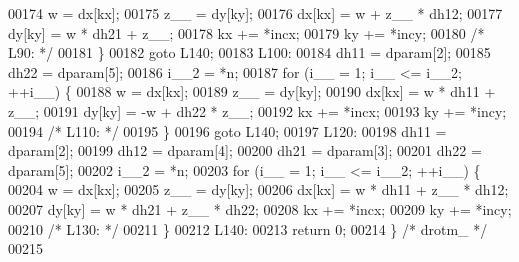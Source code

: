 \begin{DoxyCode}
00174     w = dx[kx];
00175     z\_\_ = dy[ky];
00176     dx[kx] = w + z\_\_ * dh12;
00177     dy[ky] = w * dh21 + z\_\_;
00178     kx += *incx;
00179     ky += *incy;
00180 \textcolor{comment}{/* L90: */}
00181     \}
00182     \textcolor{keywordflow}{goto} L140;
00183 L100:
00184     dh11 = dparam[2];
00185     dh22 = dparam[5];
00186     i\_\_2 = *n;
00187     \textcolor{keywordflow}{for} (i\_\_ = 1; i\_\_ <= i\_\_2; ++i\_\_) \{
00188     w = dx[kx];
00189     z\_\_ = dy[ky];
00190     dx[kx] = w * dh11 + z\_\_;
00191     dy[ky] = -w + dh22 * z\_\_;
00192     kx += *incx;
00193     ky += *incy;
00194 \textcolor{comment}{/* L110: */}
00195     \}
00196     \textcolor{keywordflow}{goto} L140;
00197 L120:
00198     dh11 = dparam[2];
00199     dh12 = dparam[4];
00200     dh21 = dparam[3];
00201     dh22 = dparam[5];
00202     i\_\_2 = *n;
00203     \textcolor{keywordflow}{for} (i\_\_ = 1; i\_\_ <= i\_\_2; ++i\_\_) \{
00204     w = dx[kx];
00205     z\_\_ = dy[ky];
00206     dx[kx] = w * dh11 + z\_\_ * dh12;
00207     dy[ky] = w * dh21 + z\_\_ * dh22;
00208     kx += *incx;
00209     ky += *incy;
00210 \textcolor{comment}{/* L130: */}
00211     \}
00212 L140:
00213     \textcolor{keywordflow}{return} 0;
00214 \} \textcolor{comment}{/* drotm\_ */}
00215 
\end{DoxyCode}
